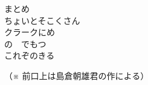 \documentclass[10pt,b5j]{tarticle} %
\begin{document}
\begin{enumerate}
\begin{minipage}[c]{\blocksize}
    \end{minipage}
    \begin{minipage}[c]{\blocksize}

        \vspace{\linespace}
        \item[まとめ]~\\
        ちょいとそこくさん\\
        クラークにめ\\
        の　でもつ\\
        これぞのきる
    
    \end{minipage}
\end{enumerate} %

\begin{flushright}
    （※ 前口上は島倉朝雄君の作による）
\end{flushright}

\end{document}
